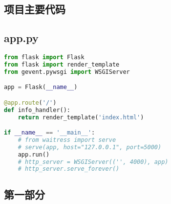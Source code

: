 \documentclass[12pt,AutoFakeBold]{article}
\begin{document}
\newpage
\begin{appendices} 

\section{项目主要代码}

\subsection{app.py}

\begin{lstlisting}[language=python]
from flask import Flask
from flask import render_template
from gevent.pywsgi import WSGIServer

app = Flask(__name__)

@app.route('/')
def info_handler():
    return render_template('index.html')

if __name__ == '__main__':
    # from waitress import serve
    # serve(app, host="127.0.0.1", port=5000)
    app.run()
    # http_server = WSGIServer(('', 4000), app)
    # http_server.serve_forever()
\end{lstlisting}

\subsection{第一部分}


\end{appendices}
\end{document}
